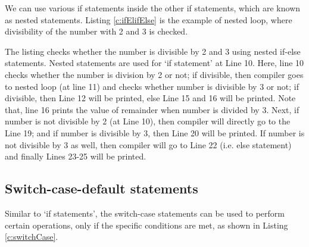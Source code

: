 \begin{pyExmp}
	We can use various if statements inside the other if statements, which are known as nested statements. Listing \ref{c:ifElifElse} is the example of nested loop, where divisibility of the number with 2 and 3 is checked.  
\end{pyExmp}
\begin{explanation}
	 The listing checks whether the number is divisible by 2 and 3 using nested if-else statements. Nested statements are used for `if statement' at Line 10. Here, line 10 checks whether the number is division by 2 or not; if divisible, then compiler goes to nested loop (at line 11) and checks whether number is divisible by 3 or not; if divisible, then Line 12 will be printed, else Line 15 and 16 will be printed. Note that, line 16 prints the value of remainder when number is divided by 3. Next, if number is not divisible by 2 (at Line 10), then compiler will directly go to the Line 19; and if number is divisible by 3, then Line 20 will be printed. If number is not divisible by 3 as well, then compiler will go to Line 22 (i.e. else statement) and finally Lines 23-25 will be printed.
\end{explanation}




\subsection{Switch-case-default statements}
Similar to `if statements', the switch-case statements can be used to perform certain operations, only if the specific conditions are met, as shown in Listing \ref{c:switchCase}. 

